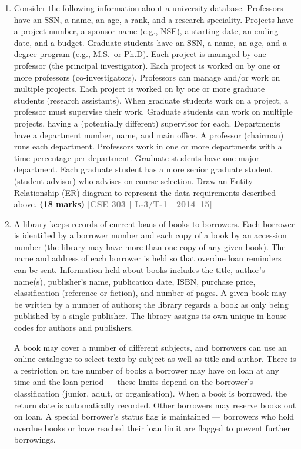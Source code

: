 \documentclass[12pt]{article}
\newcommand{\yr}[1]{\hfill\textcolor{gray}{\small\textbf{[#1]}}}
\newcommand{\mk}[1]{\textcolor{orange!70!black}{\small\textbf{(#1 marks)}}}
\begin{document}
\begin{enumerate}
\item Consider the following information about a university database. Professors have an SSN, a name, an age, a rank, and a research speciality. Projects have a project number, a sponsor name (e.g., NSF), a starting date, an ending date, and a budget. Graduate students have an SSN, a name, an age, and a degree program (e.g., M.S.\ or Ph.D). Each project is managed by one professor (the principal investigator). Each project is worked on by one or more professors (co-investigators). Professors can manage and/or work on multiple projects. Each project is worked on by one or more graduate students (research assistants). When graduate students work on a project, a professor must supervise their work. Graduate students can work on multiple projects, having a (potentially different) supervisor for each. Departments have a department number, name, and main office. A professor (chairman) runs each department. Professors work in one or more departments with a time percentage per department. Graduate students have one major department. Each graduate student has a more senior graduate student (student advisor) who advises on course selection.
Draw an Entity-Relationship (ER) diagram to represent the data requirements described above.
\mk{18} \yr{CSE 303 | L-3/T-1 | 2014--15}


\item A library keeps records of current loans of books to borrowers. Each borrower is identified by a borrower number and each copy of a book by an accession number (the library may have more than one copy of any given book). The name and address of each borrower is held so that overdue loan reminders can be sent. Information held about books includes the title, author's name(s), publisher's name, publication date, ISBN, purchase price, classification (reference or fiction), and number of pages. A given book may be written by a number of authors; the library regards a book as only being published by a single publisher. The library assigns its own unique in-house codes for authors and publishers.

A book may cover a number of different subjects, and borrowers can use an online catalogue to select texts by subject as well as title and author. There is a restriction on the number of books a borrower may have on loan at any time and the loan period --- these limits depend on the borrower's classification (junior, adult, or organisation). When a book is borrowed, the return date is automatically recorded. Other borrowers may reserve books out on loan. A special borrower's status flag is maintained --- borrowers who hold overdue books or have reached their loan limit are flagged to prevent further borrowings.


\end{enumerate}
\end{document}
